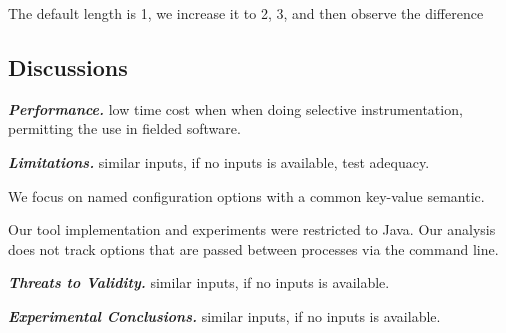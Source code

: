 The default length is 1, we increase it to 2, 3, and then observe the difference

\subsection{Discussions}

\noindent \textbf{\textit{Performance.}} low time cost when when doing
selective instrumentation, permitting the use in fielded software.

\vspace{1mm}

\noindent \textbf{\textit{Limitations.}} similar inputs, if no inputs is available, test adequacy.

We focus on named configuration options with a common key-value semantic.

Our tool implementation and experiments were restricted to Java. Our analysis
does not track options that are passed between processes via the command line.

\vspace{1mm}

\noindent \textbf{\textit{Threats to Validity.}} similar inputs, if no inputs is available.

\vspace{1mm}

\noindent \textbf{\textit{Experimental Conclusions.}} similar inputs, if no inputs is available.

